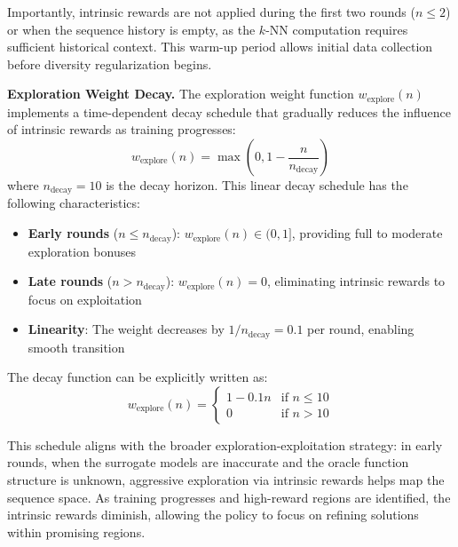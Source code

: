 Importantly, intrinsic rewards are not applied during the first two rounds ($n \leq 2$) or when the sequence history is empty, as the $k$-NN computation requires sufficient historical context. This warm-up period allows initial data collection before diversity regularization begins.

\textbf{Exploration Weight Decay.} The exploration weight function $w_{\text{explore}}(n)$ implements a time-dependent decay schedule that gradually reduces the influence of intrinsic rewards as training progresses:
%
\begin{equation}
w_{\text{explore}}(n) = \max\left(0, 1 - \frac{n}{n_{\text{decay}}}\right)
\end{equation}
%
where $n_{\text{decay}} = 10$ is the decay horizon. This linear decay schedule has the following characteristics:
\begin{itemize}
    \item \textbf{Early rounds} ($n \leq n_{\text{decay}}$): $w_{\text{explore}}(n) \in (0, 1]$, providing full to moderate exploration bonuses
    \item \textbf{Late rounds} ($n > n_{\text{decay}}$): $w_{\text{explore}}(n) = 0$, eliminating intrinsic rewards to focus on exploitation
    \item \textbf{Linearity}: The weight decreases by $1/n_{\text{decay}} = 0.1$ per round, enabling smooth transition
\end{itemize}

The decay function can be explicitly written as:
%
\begin{equation}
w_{\text{explore}}(n) = \begin{cases}
1 - 0.1n & \text{if } n \leq 10 \\
0 & \text{if } n > 10
\end{cases}
\end{equation}

This schedule aligns with the broader exploration-exploitation strategy: in early rounds, when the surrogate models are inaccurate and the oracle function structure is unknown, aggressive exploration via intrinsic rewards helps map the sequence space. As training progresses and high-reward regions are identified, the intrinsic rewards diminish, allowing the policy to focus on refining solutions within promising regions.

